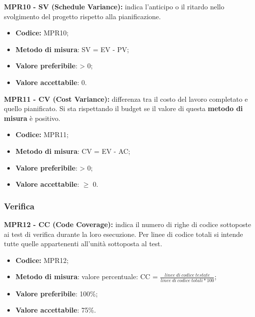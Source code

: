 \textbf{MPR10 - SV (Schedule Variance):} indica l'anticipo o il ritardo nello svolgimento del progetto rispetto alla pianificazione.
\begin{itemize}
    \item \textbf{Codice:} MPR10;
    \item \textbf{Metodo di misura}: SV = EV - PV;
    \item \textbf{Valore preferibile}: > 0;
    \item \textbf{Valore accettabile}: 0.
\end{itemize}
\textbf{MPR11 - CV (Cost Variance):} differenza tra il costo del lavoro completato e quello pianificato. Si sta rispettando il budget se il valore di questa \textbf{metodo di misura} 
è positivo.
\begin{itemize}
    \item \textbf{Codice:} MPR11;
    \item \textbf{Metodo di misura}: CV = EV - AC;
    \item \textbf{Valore preferibile}: > 0;
    \item \textbf{Valore accettabile}: $\geq$ 0.
\end{itemize}
\subsubsection{Verifica}
\textbf{MPR12 - CC (Code Coverage):} indica il numero di righe di codice sottoposte ai test di verifica durante la loro esecuzione. Per linee di codice totali 
si intende tutte quelle appartenenti all'unità sottoposta al test.
\begin{itemize}
    \item \textbf{Codice:} MPR12;
    \item \textbf{Metodo di misura}: valore percentuale: CC = $\frac{linee \ di \ codice \ testate}{linee \ di \ codice \ totali * 100}$;
    \item \textbf{Valore preferibile}: 100\%;
    \item \textbf{Valore accettabile}: 75\%.
\end{itemize}
